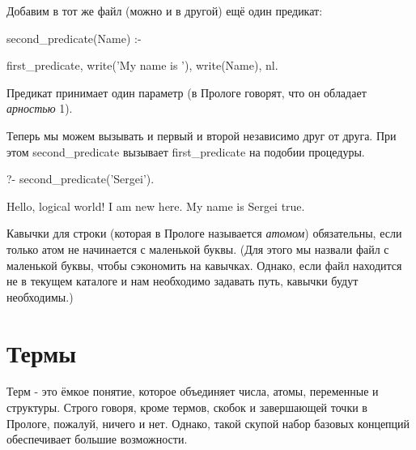 \documentclass[a4paper]{book}
\begin{document}
Добавим в тот же файл (можно и в другой) ещё один предикат:

\begin{example}{}{}
second_predicate(Name) :-

  first_predicate,
  write('My name is '), write(Name), nl.
\end{example}

Предикат принимает один параметр (в Прологе говорят, что он
обладает {\it арностью\/} 1).

Теперь мы можем вызывать и первый и второй независимо друг от
друга. При этом second_predicate вызывает first_predicate на
подобии процедуры.

\begin{example}{}{}
?- second_predicate('Sergei').

Hello, logical world!
I am new here.
My name is Sergei
true.
\end{example}

Кавычки для строки (которая в Прологе называется {\it атомом\/})
обязательны, если только атом не начинается с маленькой
буквы. (Для этого мы назвали файл с маленькой буквы, чтобы
сэкономить на кавычках. Однако, если файл находится не в текущем
каталоге и нам необходимо задавать путь, кавычки будут
необходимы.)

\section{Термы}
\label{terms}

Терм - это ёмкое понятие, которое объединяет числа, атомы,
переменные и структуры. Строго говоря, кроме термов, скобок и
завершающей точки в Прологе, пожалуй, ничего и нет. Однако, такой
скупой набор базовых концепций обеспечивает большие возможности.
\end{document}
